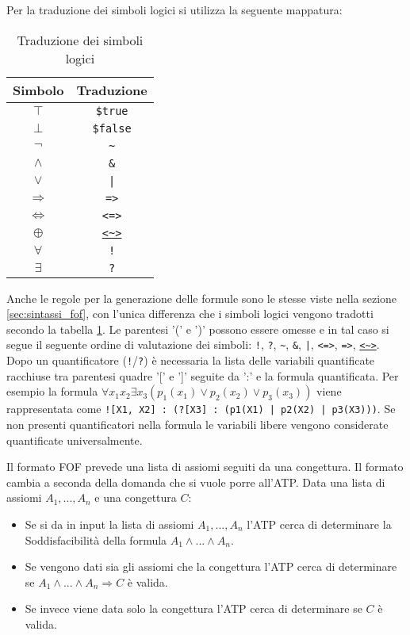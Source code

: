 \documentclass[./main.tex]{subfiles}
\begin{document}
Per la traduzione dei simboli logici si utilizza la seguente mappatura:

\begin{table}[H]
  \centering
  \begin{tabular}{|c|c|}
    \hline
    \textbf{Simbolo} & \textbf{Traduzione} \\
    \hline
    $\top$ & \texttt{\$true} \\
    $\bot$ & \texttt{\$false} \\
    $\lnot$ & \texttt{\~} \\
    $\land$ & \texttt{\&} \\
    $\lor$ & \texttt{|} \\
    $\Rightarrow$ & \texttt{=>} \\
    $\Leftrightarrow$ & \texttt{<=>} \\
    $\oplus$ & \texttt{\url{<~>}} \\
    $\forall$ & \texttt{!} \\
    $\exists$ & \texttt{?} \\
    \hline
  \end{tabular}
  \caption{Traduzione dei simboli logici}
  \label{tab:traduzione_simboli_logici}
\end{table}


Anche le regole per la generazione delle formule sono le stesse viste nella sezione \ref{sec:sintassi_fof},
con l'unica differenza che i simboli logici vengono tradotti secondo la tabella \ref{tab:traduzione_simboli_logici}.
Le parentesi '(' e ')' possono essere omesse e in tal caso si segue il seguente ordine di valutazione dei simboli:
\texttt{!}, \texttt{?}, \texttt{\textasciitilde}, \texttt{\&}, \texttt{|}, \texttt{<=>}, \texttt{=>}, \texttt{\url{<~>}}.
Dopo un quantificatore (\texttt{!}/\texttt{?}) è necessaria la lista delle variabili quantificate racchiuse tra parentesi quadre '[' e ']' 
seguite da ':' e la formula quantificata.
Per esempio la formula $\forall x_1 x_2 \exists x_3 (p_1(x_1) \lor p_2(x_2) \lor p_3(x_3))$ viene 
rappresentata come \texttt{![X1, X2] : (?[X3] : (p1(X1) | p2(X2) | p3(X3)))}.
Se non presenti quantificatori nella formula le variabili libere vengono considerate quantificate universalmente.


Il formato FOF prevede una lista di assiomi seguiti da una congettura. 
Il formato cambia a seconda della domanda che si vuole porre all'ATP.
Data una lista di assiomi $A_1, ..., A_n$ e una congettura $C$:

\begin{itemize}
  \item Se si da in input la lista di assiomi $A_1, ..., A_n$ l'ATP cerca di determinare la Soddisfacibilità della formula $A_1 \land ... \land A_n$.
  \item Se vengono dati sia gli assiomi che la congettura l'ATP cerca di determinare se $A_1 \land ... \land A_n \Rightarrow C$ è valida.
  \item Se invece viene data solo la congettura l'ATP cerca di determinare se $C$ è valida.
\end{itemize}
\end{document}

